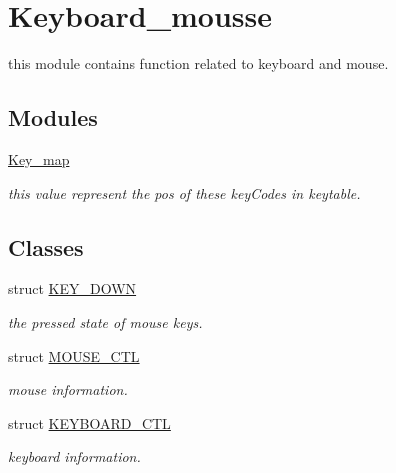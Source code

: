 \hypertarget{group__keyboard__mousse}{}\section{Keyboard\+\_\+mousse}
\label{group__keyboard__mousse}


this module contains function related to keyboard and mouse.  


\subsection*{Modules}
\begin{DoxyCompactItemize}
\item 
\hyperlink{group__key__map}{Key\+\_\+map}
\begin{DoxyCompactList}\small\item\em this value represent the pos of these key\+Codes in keytable. \end{DoxyCompactList}\end{DoxyCompactItemize}
\subsection*{Classes}
\begin{DoxyCompactItemize}
\item 
struct \hyperlink{struct_k_e_y___d_o_w_n}{K\+E\+Y\+\_\+\+D\+O\+W\+N}
\begin{DoxyCompactList}\small\item\em the pressed state of mouse keys. \end{DoxyCompactList}\item 
struct \hyperlink{struct_m_o_u_s_e___c_t_l}{M\+O\+U\+S\+E\+\_\+\+C\+T\+L}
\begin{DoxyCompactList}\small\item\em mouse information. \end{DoxyCompactList}\item 
struct \hyperlink{struct_k_e_y_b_o_a_r_d___c_t_l}{K\+E\+Y\+B\+O\+A\+R\+D\+\_\+\+C\+T\+L}
\begin{DoxyCompactList}\small\item\em keyboard information. \end{DoxyCompactList}\end{DoxyCompactItemize}
